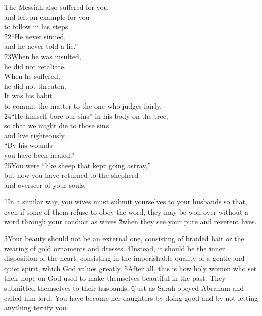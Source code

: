 \begin{poetry}
\poeml The Messiah also suffered for you \\
\poemll    and left an example for you \\
\poemlll       to follow in his steps. \\
\poeml \v{22}``He never sinned, \\
\poemll    and he never told a lie.'' \\
\poeml \v{23}When he was insulted, \\
\poemll    he did not retaliate. \\
\poeml When he suffered, \\
\poemll    he did not threaten. \\
\poeml It was his habit \\
\poemll    to commit the matter to the one who judges fairly. \\
\poeml \v{24}``He himself bore our sins'' in his body on the tree, \\
\poemll    so that we might die to those sins \\
\poemlll       and live righteously. \\
\poeml ``By his wounds \\
\poemll    you have been healed.'' \\
\poeml \v{25}You were ``like sheep that kept going astray,'' \\
\poemll    but now you have returned to the shepherd \\
\poemlll       and overseer of your souls.
\end{poetry}

\v{1}In a similar way, you wives must submit yourselves to your husbands so that, even if some of them refuse to obey the word, they may be won over without a word through your conduct as wives \v{2}when they see your pure and reverent lives.

\v{3}Your beauty should not be an external one, consisting of braided hair or the wearing of gold ornaments and dresses. \v{4}Instead, it should be the inner disposition of the heart, consisting in the imperishable quality of a gentle and quiet spirit, which God values greatly. \v{5}After all, this is how holy women who set their hope on God used to make themselves beautiful in the past. They submitted themselves to their husbands, \v{6}just as Sarah obeyed Abraham and called him lord. You have become her daughters by doing good and by not letting anything terrify you.

